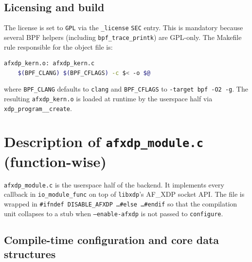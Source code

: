 \documentclass[10pt, letterpaper, twocolumn]{article}
\begin{document}
\subsection{Licensing and build}

The license is set to \texttt{GPL} via the \texttt{\_license} \texttt{SEC} entry. This is mandatory because several BPF helpers (including \texttt{bpf\_trace\_printk}) are GPL-only. The Makefile rule responsible for the object file is:
\begin{lstlisting}[language=bash]
afxdp_kern.o: afxdp_kern.c
    $(BPF_CLANG) $(BPF_CFLAGS) -c $< -o $@
\end{lstlisting}
where \texttt{BPF\_CLANG} defaults to \texttt{clang} and \texttt{BPF\_CFLAGS} to \texttt{-target bpf -O2 -g}. The resulting \texttt{afxdp\_kern.o} is loaded at runtime by the userspace half via \texttt{xdp\_program\_\_create}.

\section{Description of \texttt{afxdp\_module.c} (function-wise)}

\texttt{afxdp\_module.c} is the userspace half of the backend. It implements every callback in \texttt{io\_module\_func} on top of \texttt{libxdp}'s AF\_XDP socket API. The file is wrapped in \texttt{\#ifndef DISABLE\_AFXDP \dots \#else \dots \#endif} so that the compilation unit collapses to a stub when \texttt{--enable-afxdp} is not passed to \texttt{configure}.

\subsection{Compile-time configuration and core data structures}
\end{document}
